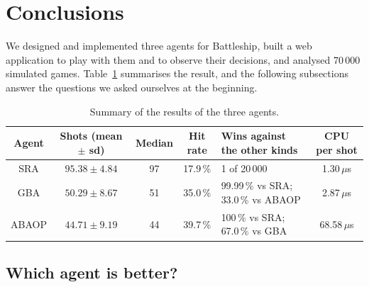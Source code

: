 \documentclass[letterpaper,11pt]{article} %
\renewcommand{\arraystretch}{1.8}
\begin{document}
\section{Conclusions}
\label{sec:conclusions}

We designed and implemented three agents for Battleship, built a web application to play with them and to observe their decisions, and analysed 70\,000 simulated games. Table~\ref{tab:summary} summarises the result, and the following subsections answer the questions we asked ourselves at the beginning.

\begin{table}[H]
    \centering
    \renewcommand{\arraystretch}{1.4}
    \begin{tabular}{|c|c|c|c|p{4.2cm}|c|}
        \hline
        \rowcolor{blue!20}
        Agent & Shots (mean $\pm$ sd) & Median & Hit rate & Wins against the other kinds & CPU per shot \\ \hline
        SRA   & $95.38\pm4.84$ & 97 & 17.9\,\% & 1 of 20\,000 & 1.30\,$\mu$s \\ \hline
        GBA   & $50.29\pm8.67$ & 51 & 35.0\,\% & 99.99\,\% vs SRA; 33.0\,\% vs ABAOP & 2.87\,$\mu$s \\ \hline
        ABAOP & $44.71\pm9.19$ & 44 & 39.7\,\% & 100\,\% vs SRA; 67.0\,\% vs GBA & 68.58\,$\mu$s \\ \hline
    \end{tabular}
    \caption{Summary of the results of the three agents.}
    \label{tab:summary}
\end{table}

\subsection{Which agent is better?}
\end{document}
